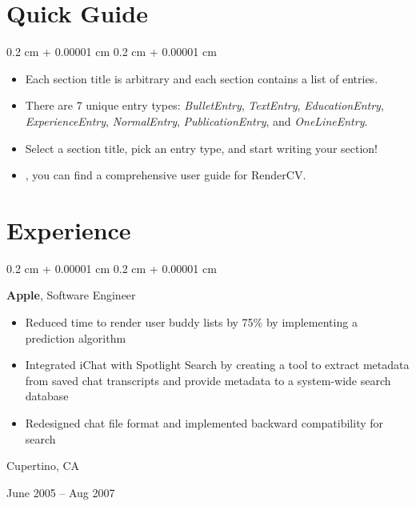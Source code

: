 \documentclass[10pt, letterpaper]{article}
\newenvironment{highlights}{
    \begin{itemize}[
        topsep=0.10 cm,
        parsep=0.10 cm,
        partopsep=0pt,
        itemsep=0pt,
        leftmargin=0.4 cm + 10pt
    ]
}{
    \end{itemize}
}
\newenvironment{highlightsforbulletentries}{
    \begin{itemize}[
        topsep=0.10 cm,
        parsep=0.10 cm,
        partopsep=0pt,
        itemsep=0pt,
        leftmargin=10pt
    ]
}{
    \end{itemize}
}
\newenvironment{onecolentry}{
    \begin{adjustwidth}{
        0.2 cm + 0.00001 cm
    }{
        0.2 cm + 0.00001 cm
    }
}{
    \end{adjustwidth}
}
\newenvironment{twocolentry}[2][]{
    \onecolentry
    \def\secondColumn{#2}
    \setcolumnwidth{\fill, 4.5 cm}
    \begin{paracol}{2}
}{
    \switchcolumn \raggedleft \secondColumn
    \end{paracol}
    \endonecolentry
}
\let\hrefWithoutArrow\href
\renewcommand{\href}[2]{\hrefWithoutArrow{#1}{\ifthenelse{\equal{#2}{}}{ }{#2 }\raisebox{.15ex}{\footnotesize \faExternalLink*}}}
\begin{document}
\section{Quick Guide} 

    \begin{onecolentry}
        \begin{highlightsforbulletentries}


        \item Each section title is arbitrary and each section contains a list of entries.

        \item There are 7 unique entry types: \textit{BulletEntry}, \textit{TextEntry}, \textit{EducationEntry}, \textit{ExperienceEntry}, \textit{NormalEntry}, \textit{PublicationEntry}, and \textit{OneLineEntry}.

        \item Select a section title, pick an entry type, and start writing your section!

        \item \href{https://docs.rendercv.com/user_guide/}{Here}, you can find a comprehensive user guide for RenderCV.


        \end{highlightsforbulletentries}
    \end{onecolentry}




    
    \section{Experience}



        
        \begin{twocolentry}{
            Cupertino, CA

        June 2005 – Aug 2007
        }
            \textbf{Apple}, Software Engineer
            \begin{highlights}
                \item Reduced time to render user buddy lists by 75\% by implementing a prediction algorithm
                \item Integrated iChat with Spotlight Search by creating a tool to extract metadata from saved chat transcripts and provide metadata to a system-wide search database
                \item Redesigned chat file format and implemented backward compatibility for search
            \end{highlights}
        \end{twocolentry}
\end{document}
